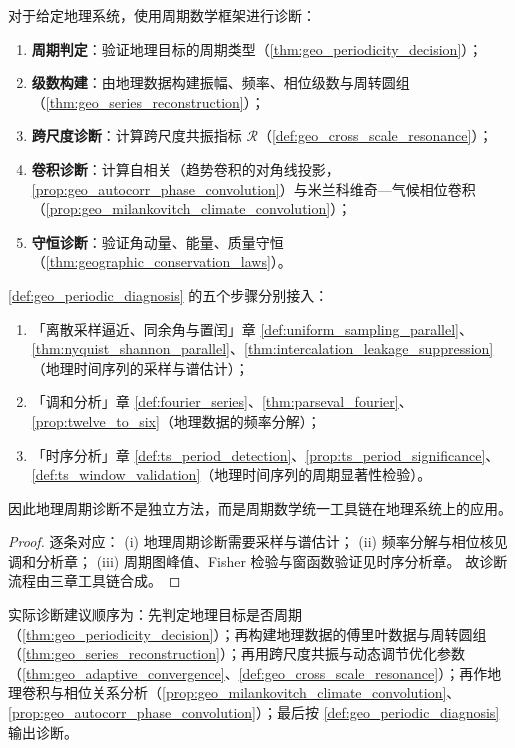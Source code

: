 \begin{definition}[地理周期诊断流程]\label{def:geo_periodic_diagnosis}
对于给定地理系统，使用周期数学框架进行诊断：
\begin{enumerate}[label=(\roman*)]
    \item \textbf{周期判定}：验证地理目标的周期类型（\cref{thm:geo_periodicity_decision}）；
    \item \textbf{级数构建}：由地理数据构建振幅、频率、相位级数与周转圆组（\cref{thm:geo_series_reconstruction}）；
    \item \textbf{跨尺度诊断}：计算跨尺度共振指标 $\mathcal R$（\cref{def:geo_cross_scale_resonance}）；
    \item \textbf{卷积诊断}：计算自相关（趋势卷积的对角线投影，\cref{prop:geo_autocorr_phase_convolution}）与米兰科维奇—气候相位卷积（\cref{prop:geo_milankovitch_climate_convolution}）；
    \item \textbf{守恒诊断}：验证角动量、能量、质量守恒（\cref{thm:geographic_conservation_laws}）。
\end{enumerate}
\end{definition}

\begin{theorem}[地理周期诊断流程与三章接口]\label{thm:geo_diagnosis_integration}
\cref{def:geo_periodic_diagnosis} 的五个步骤分别接入：
\begin{enumerate}[label=(\roman*)]
    \item 「离散采样逼近、同余角与置闰」章 \cref{def:uniform_sampling_parallel}、\cref{thm:nyquist_shannon_parallel}、\cref{thm:intercalation_leakage_suppression}（地理时间序列的采样与谱估计）；
    \item 「调和分析」章 \cref{def:fourier_series}、\cref{thm:parseval_fourier}、\cref{prop:twelve_to_six}（地理数据的频率分解）；
    \item 「时序分析」章 \cref{def:ts_period_detection}、\cref{prop:ts_period_significance}、\cref{def:ts_window_validation}（地理时间序列的周期显著性检验）。
\end{enumerate}
因此地理周期诊断不是独立方法，而是周期数学统一工具链在地理系统上的应用。
\end{theorem}

\begin{proof}
逐条对应：
(i) 地理周期诊断需要采样与谱估计；
(ii) 频率分解与相位核见调和分析章；
(iii) 周期图峰值、Fisher 检验与窗函数验证见时序分析章。
故诊断流程由三章工具链合成。
\end{proof}

\begin{remark}[整合后的操作顺序]\label{rem:geo_integration_order}
实际诊断建议顺序为：先判定地理目标是否周期（\cref{thm:geo_periodicity_decision}）；再构建地理数据的傅里叶数据与周转圆组（\cref{thm:geo_series_reconstruction}）；再用跨尺度共振与动态调节优化参数（\cref{thm:geo_adaptive_convergence}、\cref{def:geo_cross_scale_resonance}）；再作地理卷积与相位关系分析（\cref{prop:geo_milankovitch_climate_convolution}、\cref{prop:geo_autocorr_phase_convolution}）；最后按 \cref{def:geo_periodic_diagnosis} 输出诊断。
\end{remark}

